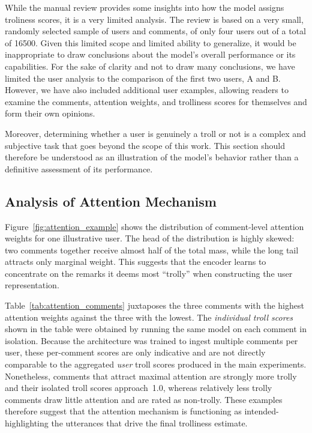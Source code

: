 \documentclass[twoside]{ctuthesis}
\theoremstyle{plain}
\theoremstyle{definition}
\theoremstyle{note}
\begin{document}
While the manual review provides some insights into how the model assigns troliness scores, it is a very limited analysis. The review is based on a very small, randomly selected sample of users and comments, of only four users out of a total of 16500. Given this limited scope and limited ability to generalize, it would be inappropriate to draw conclusions about the model's overall performance or its capabilities. For the sake of clarity and not to draw many conclusions, we have limited the user analysis to the comparison of the first two users, A and B. However, we have also included additional user examples, allowing readers to examine the comments, attention weights, and trolliness scores for themselves and form their own opinions. \par
Moreover, determining whether a user is genuinely a troll or not is a complex and subjective task that goes beyond the scope of this work. This section should therefore be understood as an illustration of the model's behavior rather than a definitive assessment of its performance.\par

\subsection{Analysis of Attention Mechanism}
\label{subsec:attention}

Figure~\ref{fig:attention_example} shows the distribution of comment-level attention weights for one illustrative user.  The head of the distribution is highly skewed: two comments together receive almost half of the total mass, while the long tail attracts only marginal weight.  This suggests that the encoder learns to concentrate on the remarks it deems most “trolly” when constructing the user representation.

Table~\ref{tab:attention_comments} juxtaposes the three comments with the highest attention weights against the three with the lowest. The \emph{individual troll scores} shown in the table were obtained by running the same model on each comment in isolation.  Because the architecture was trained to ingest multiple comments per user, these per-comment scores are only indicative and are not directly comparable to the aggregated \emph{user} troll scores produced in the main experiments. Nonetheless, comments that attract maximal attention are strongly more trolly and their isolated troll scores approach~1.0, whereas relatively less trolly comments draw little attention and are rated as non-trolly. These examples therefore suggest that the attention mechanism is functioning as intended-highlighting the utterances that drive the final trolliness estimate.
\end{document}
